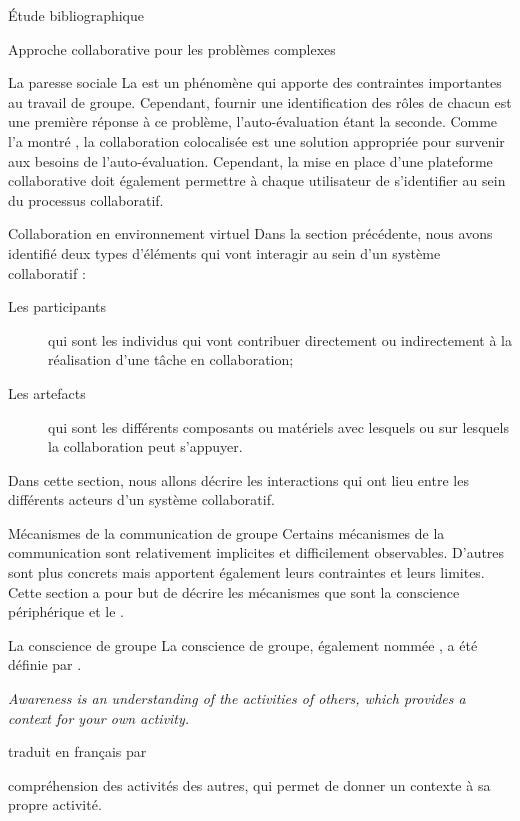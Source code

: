 \documentclass[myfrancais,ngerman,english,frenchb]{mythesis}
\begin{document}
\begin{mychapter}{Étude bibliographique}
\begin{mysection}{Approche collaborative pour les problèmes complexes}
\begin{mysubsection}{La paresse sociale}
				La  est un phénomène qui apporte des contraintes importantes au travail de groupe.
				Cependant, fournir une identification des rôles de chacun est une première réponse à ce problème, l'auto-évaluation étant la seconde.
				Comme l'a montré , la collaboration colocalisée est une solution appropriée pour survenir aux besoins de l'auto-évaluation.
				Cependant, la mise en place d'une plateforme collaborative doit également permettre à chaque utilisateur de s'identifier au sein du processus collaboratif.
			\end{mysubsection}
		\end{mysection}
		\begin{mysection}{Collaboration en environnement virtuel}
			Dans la section précédente, nous avons identifié deux types d'éléments qui vont interagir au sein d'un système collaboratif :
			\begin{description}
				\item[Les participants] qui sont les individus qui vont contribuer directement ou indirectement à la réalisation d'une tâche en collaboration;
				\item[Les artefacts] qui sont les différents composants ou matériels avec lesquels ou sur lesquels la collaboration peut s'appuyer.
			\end{description}
			Dans cette section, nous allons décrire les interactions qui ont lieu entre les différents acteurs d'un système collaboratif.
			\begin{mysubsection}{Mécanismes de la communication de groupe}
				Certains mécanismes de la communication sont relativement implicites et difficilement observables.
				D'autres sont plus concrets mais apportent également leurs contraintes et leurs limites.
				Cette section a pour but de décrire les mécanismes que sont la conscience périphérique et le \mygrounding.
				\begin{mysubsubsection}{La conscience de groupe}
					La conscience de groupe, également nommée \myawareness, a été définie par .
					\begin{myquote}[english]
						\it Awareness is an understanding of the activities of others, which provides a context for your own activity.
					\end{myquote}
					traduit en français par 
					\begin{myquote} compréhension des activités des autres, qui permet de donner un contexte à sa propre activité.
					\end{myquote}


\end{mysubsubsection}
\end{mysubsection}
\end{mysection}
\end{mychapter}
\end{document}
